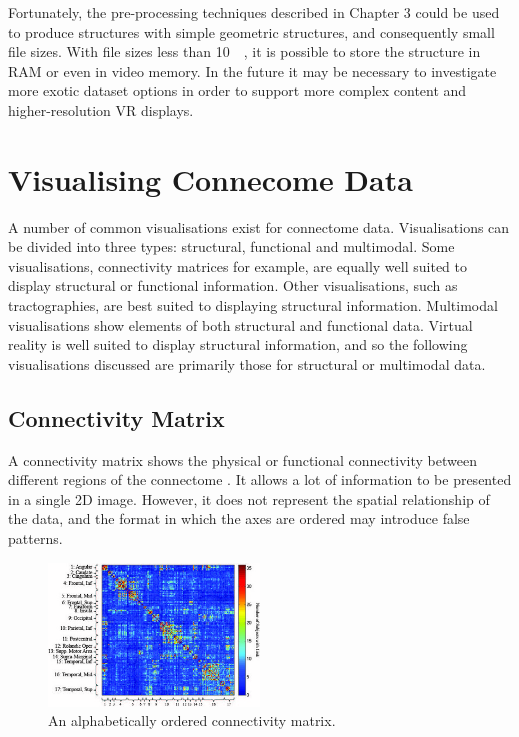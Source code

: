 \documentclass[MSc,paper=a4,pagesize=auto]{icldt}
\begin{document}
Fortunately, the pre-processing techniques described in Chapter 3 could be used to produce structures with simple geometric structures, and consequently small file sizes. With file sizes less than \SI{10}{\mega\byte}, it is possible to store the structure in RAM or even in video memory. In the future it may be necessary to investigate more exotic dataset options in order to support more complex content and higher-resolution VR displays.


\section{Visualising Connecome Data}
A number of common visualisations exist for connectome data. Visualisations can be divided into three types: structural, functional and multimodal. Some visualisations, connectivity matrices for example, are equally well suited to display structural or functional information. Other visualisations, such as tractographies, are best suited to displaying structural information. Multimodal visualisations show elements of both structural and functional data. Virtual reality is well suited to display structural information, and so the following visualisations discussed are primarily those for structural or multimodal data.

\subsection{Connectivity Matrix}
A connectivity matrix shows the physical or functional connectivity between different regions of the connectome \cite{Wang2011}. It allows a lot of information to be presented in a single 2D image. However, it does not represent the spatial relationship of the data, and the format in which the axes are ordered may introduce false patterns. 

\begin{figure}[htbp!]
    \centering
    \includegraphics[width=0.5\textwidth]{resources/connectivity_matrix}
    \caption{An alphabetically ordered connectivity matrix. \cite{Wang2011}}
    \label{fig:connectivity_matrix}
\end{figure}
\end{document}
